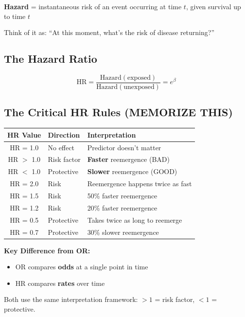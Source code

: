 \documentclass[11pt,a4paper]{article}
\begin{document}
\textbf{Hazard} = instantaneous risk of an event occurring at time $t$, given survival up to time $t$

Think of it as: ``At this moment, what's the risk of disease returning?''

\subsection{The Hazard Ratio}

\begin{equation}
\text{HR} = \frac{\text{Hazard}(\text{exposed})}{\text{Hazard}(\text{unexposed})} = e^{\beta}
\end{equation}

\subsection{The Critical HR Rules (MEMORIZE THIS)}

\begin{table}[h]
\centering
\begin{tabular}{@{}clp{7cm}@{}}
\toprule
\textbf{HR Value} & \textbf{Direction} & \textbf{Interpretation} \\
\midrule
HR = 1.0 & No effect & Predictor doesn't matter \\
HR $>$ 1.0 & Risk factor & \textbf{Faster} reemergence (BAD) \\
HR $<$ 1.0 & Protective & \textbf{Slower} reemergence (GOOD) \\
\midrule
HR = 2.0 & Risk & Reemergence happens twice as fast \\
HR = 1.5 & Risk & 50\% faster reemergence \\
HR = 1.2 & Risk & 20\% faster reemergence \\
HR = 0.5 & Protective & Takes twice as long to reemerge \\
HR = 0.7 & Protective & 30\% slower reemergence \\
\bottomrule
\end{tabular}
\end{table}

\begin{keypoint}
\textbf{Key Difference from OR:}
\begin{itemize}
    \item OR compares \textbf{odds} at a single point in time
    \item HR compares \textbf{rates} over time
\end{itemize}

Both use the same interpretation framework: $>1$ = risk factor, $<1$ = protective.
\end{keypoint}
\end{document}
